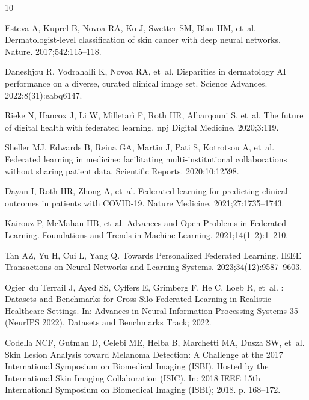 \documentclass[VANCOUVER,Times1COL]{WileyNJDv5}
\begin{document}
\begin{thebibliography}{10}

Esteva A, Kuprel B, Novoa RA, Ko J, Swetter SM, Blau HM, et~al.
\newblock Dermatologist-level classification of skin cancer with deep neural
  networks.
\newblock Nature. 2017;542:115--118.

Daneshjou R, Vodrahalli K, Novoa RA, et~al.
\newblock Disparities in dermatology {AI} performance on a diverse, curated
  clinical image set.
\newblock Science Advances. 2022;8(31):eabq6147.

Rieke N, Hancox J, Li W, Milletar{\`i} F, Roth HR, Albarqouni S, et~al.
\newblock The future of digital health with federated learning.
\newblock npj Digital Medicine. 2020;3:119.

Sheller MJ, Edwards B, Reina GA, Martin J, Pati S, Kotrotsou A, et~al.
\newblock Federated learning in medicine: facilitating multi-institutional
  collaborations without sharing patient data.
\newblock Scientific Reports. 2020;10:12598.

Dayan I, Roth HR, Zhong A, et~al.
\newblock Federated learning for predicting clinical outcomes in patients with
  {COVID-19}.
\newblock Nature Medicine. 2021;27:1735--1743.

Kairouz P, McMahan HB, et~al.
\newblock Advances and Open Problems in Federated Learning.
\newblock Foundations and Trends in Machine Learning. 2021;14(1--2):1--210.

Tan AZ, Yu H, Cui L, Yang Q.
\newblock Towards Personalized Federated Learning.
\newblock IEEE Transactions on Neural Networks and Learning Systems.
  2023;34(12):9587--9603.

Ogier~du Terrail J, Ayed SS, Cyffers E, Grimberg F, He C, Loeb R, et~al.
: Datasets and Benchmarks for Cross-Silo Federated Learning
  in Realistic Healthcare Settings.
\newblock In: Advances in Neural Information Processing Systems 35 (NeurIPS
  2022), Datasets and Benchmarks Track; 2022.

Codella NCF, Gutman D, Celebi ME, Helba B, Marchetti MA, Dusza SW, et~al.
\newblock Skin Lesion Analysis toward Melanoma Detection: A Challenge at the
  2017 International Symposium on Biomedical Imaging ({ISBI}), Hosted by the
  International Skin Imaging Collaboration ({ISIC}).
\newblock In: 2018 IEEE 15th International Symposium on Biomedical Imaging
  (ISBI); 2018. p. 168--172.


\end{thebibliography}
\end{document}
